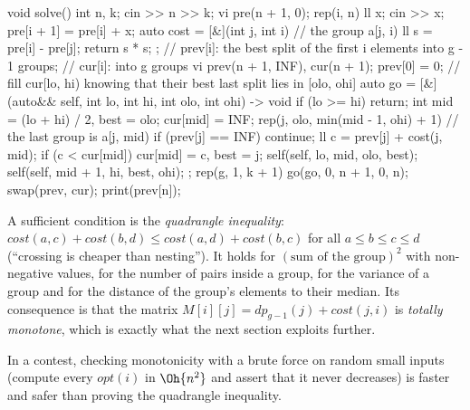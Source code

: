 \begin{code}
void solve() {
    int n, k;
    cin >> n >> k;
    vi pre(n + 1, 0);
    rep(i, n) {
        ll x;
        cin >> x;
        pre[i + 1] = pre[i] + x;
    }
    auto cost = [&](int j, int i) {  // the group a[j, i)
        ll s = pre[i] - pre[j];
        return s * s;
    };
    // prev[i]: the best split of the first i elements into g - 1 groups;
    // cur[i]: into g groups
    vi prev(n + 1, INF), cur(n + 1);
    prev[0] = 0;
    // fill cur[lo, hi) knowing that their best last split lies in [olo, ohi]
    auto go = [&](auto&& self, int lo, int hi, int olo, int ohi) -> void {
        if (lo >= hi) return;
        int mid = (lo + hi) / 2, best = olo;
        cur[mid] = INF;
        rep(j, olo, min(mid - 1, ohi) + 1) {  // the last group is a[j, mid)
            if (prev[j] == INF) continue;
            ll c = prev[j] + cost(j, mid);
            if (c < cur[mid]) cur[mid] = c, best = j;
        }
        self(self, lo, mid, olo, best);
        self(self, mid + 1, hi, best, ohi);
    };
    rep(g, 1, k + 1) {
        go(go, 0, n + 1, 0, n);
        swap(prev, cur);
    }
    print(prev[n]);
}
\end{code}


\begin{fact}
A sufficient condition is the \emph{quadrangle inequality}: $\mathit{cost}(a, c) + \mathit{cost}(b, d) \le \mathit{cost}(a, d) +
\mathit{cost}(b, c)$ for all $a \le b \le c \le d$ (``crossing is cheaper than nesting''). It holds for $(\text{sum of the
group})^2$ with non-negative values, for the number of pairs inside a group, for the variance of a group and for the distance of the
group's elements to their median. Its consequence is that the matrix $M[i][j] = dp_{g-1}(j) + \mathit{cost}(j, i)$ is \emph{totally
monotone}, which is exactly what the next section exploits further.
\end{fact}

\begin{tip}
In a contest, checking monotonicity with a brute force on random small inputs (compute every $\mathit{opt}(i)$ in $\Oh{n^2}$ and assert
that it never decreases) is faster and safer than proving the quadrangle inequality.
\end{tip}

